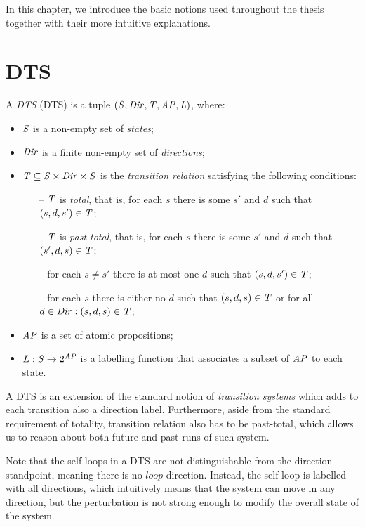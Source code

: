 In this chapter, we introduce the basic notions used throughout the thesis together with their more intuitive explanations.

\section{\Acl{DTS}}

\begin{definition}
	A \emph{\acl{DTS}} (\acs{DTS}) is a tuple $(\mathit{S}, \mathit{Dir}, \mathit{T}, \mathit{AP}, \mathit{L})$, where:
	
	\begin{itemize}
		\item $\mathit{S}$ is a non-empty set of \emph{states};
		\item $\mathit{Dir}$ is a finite non-empty set of \emph{directions};
		\item $\mathit{T} \subseteq \mathit{S} \times \mathit{Dir} \times \mathit{S}$ is the \emph{transition relation} satisfying the following conditions:
		\begin{itemize}
			\item[--] $\mathit{T}$ is \emph{total}, that is, for each $s$ there is some $s'$ and $d$ such that $(s, d,
			s')\in \mathit{T}$;
			\item[--] $\mathit{T}$ is \emph{past-total}, that is, for each $s$ there is some $s'$ and $d$ such that
			$(s', d, s)\in \mathit{T}$;
			\item[--] for each $s \ne s'$ there is at most one $d$ such that $(s, d, s')\in \mathit{T}$;
			\item[--] for each $s$ there is either no $d$ such that $(s,d,s) \in \mathit{T}$ or
			for all $d \in \mathit{Dir}: (s,d,s) \in \mathit{T}$;
		\end{itemize}
		\item $\mathit{AP}$ is a set of atomic propositions;
		\item $L : \mathit{S} \rightarrow 2^{\mathit{AP}}$ is a labelling function that associates a subset of $\mathit{AP}$ to each state.
	\end{itemize}
	
\end{definition}

A \ac{DTS} is an extension of the standard notion of \emph{transition systems} which adds to each transition also a direction label. Furthermore, aside from the standard requirement of totality, transition relation also has to be past-total, which allows us to reason about both future and past runs of such system.

Note that the self-loops in a \ac{DTS} are not distinguishable from the direction standpoint, meaning there is no $loop$ direction. Instead, the self-loop is labelled with all directions, which intuitively means that the system can move in any direction, but the perturbation is not strong enough to modify the overall state of the system.

